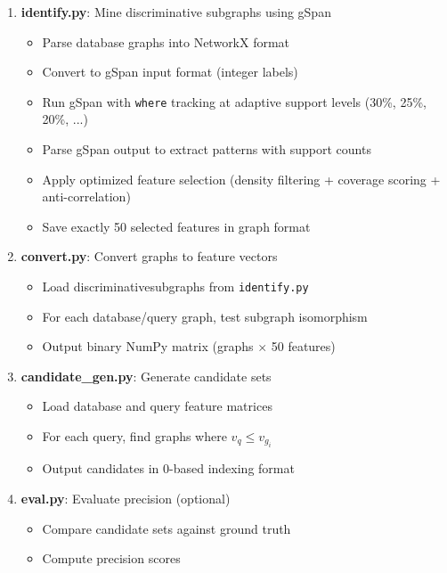\documentclass[12pt,a4paper]{article}
\begin{document}
\begin{enumerate}
    \item \textbf{identify.py}: Mine discriminative subgraphs using gSpan
    \begin{itemize}
        \item Parse database graphs into NetworkX format
        \item Convert to gSpan input format (integer labels)
        \item Run gSpan with \texttt{where} tracking at adaptive support levels (30\%, 25\%, 20\%, ...)
        \item Parse gSpan output to extract patterns with support counts
        \item Apply optimized feature selection (density filtering + coverage scoring + anti-correlation)
        \item Save exactly 50 selected features in graph format
    \end{itemize}
    
    \item \textbf{convert.py}: Convert graphs to feature vectors
    \begin{itemize}
        \item Load discriminativesubgraphs from \texttt{identify.py}
        \item For each database/query graph, test subgraph isomorphism
        \item Output binary NumPy matrix (graphs $\times$ 50 features)
    \end{itemize}
    
    \item \textbf{candidate\_gen.py}: Generate candidate sets
    \begin{itemize}
        \item Load database and query feature matrices
        \item For each query, find graphs where $v_q \leq v_{g_i}$
        \item Output candidates in 0-based indexing format
    \end{itemize}
    
    \item \textbf{eval.py}: Evaluate precision (optional)
    \begin{itemize}
        \item Compare candidate sets against ground truth
        \item Compute precision scores
    \end{itemize}
\end{enumerate}
\end{document}

